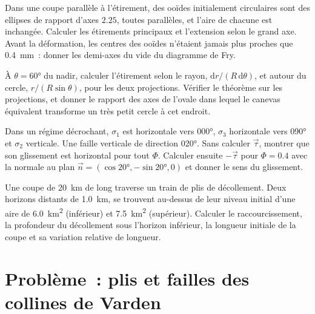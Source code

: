 \begin{exercise}[$\star\star$]\label{exo:b3:structural-analysis:9}
Dans une coupe parallèle à l'étirement, des ooïdes initialement circulaires sont
des ellipses de rapport d'axes $2.25$, toutes parallèles, et l'aire de chacune est
inchangée. Calculer les étirements principaux et l'extension selon le grand
axe. Avant la déformation, les centres des ooïdes n'étaient jamais plus proches que
\qty{0.4}{mm}~: donner les demi-axes du vide du diagramme de Fry.
\end{exercise}

\begin{exercise}[$\star\star\star$]\label{exo:b3:structural-analysis:10}
À $\theta = \ang{60}$ du nadir, calculer l'étirement selon le rayon,
$\mathrm dr/(R\,\mathrm d\theta)$, et autour du cercle, $r/(R\sin\theta)$,
pour les deux projections. Vérifier le théorème sur les projections, et donner le rapport
des axes de l'ovale dans lequel le canevas équivalent transforme un très petit
cercle à cet endroit.
\end{exercise}

\begin{exercise}[$\star\star\star$]\label{exo:b3:structural-analysis:11}
Dans un régime décrochant, $\sigma_1$ est horizontale vers \ang{000},
$\sigma_3$ horizontale vers \ang{090} et $\sigma_2$ verticale. Une faille verticale
de direction \ang{020}. Sans calculer $\vec\tau$, montrer que son glissement est
horizontal pour tout $\Phi$. Calculer ensuite $-\vec\tau$ pour $\Phi = 0.4$ avec
la normale au plan $\vec n = (\cos\ang{20}, -\sin\ang{20}, 0)$ et donner le
sens du glissement.
\end{exercise}

\begin{exercise}[$\star\star\star$]\label{exo:b3:structural-analysis:12}
Une coupe de \qty{20}{km} de long traverse un train de plis de décollement. Deux horizons
distants de \qty{1.0}{km}, se trouvent au-dessus de leur niveau initial d'une aire
de \qty{6.0}{km^2} (inférieur) et \qty{7.5}{km^2} (supérieur). Calculer le raccourcissement,
la profondeur du décollement sous l'horizon inférieur, la longueur initiale de la
coupe et sa variation relative de longueur.
\end{exercise}

\section{Problème~: plis et failles des collines de Varden}

